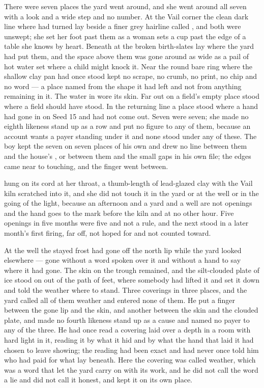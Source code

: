 There were seven places the yard went around, and she went around all seven with a look and a wide step and no number. At the Vail corner the clean dark line where  had turned lay beside a finer grey hairline called , and both were unswept; she set her foot past them as a woman sets a cup past the edge of a table she knows by heart. Beneath  at  the broken birth-slates lay where the yard had put them, and the space above them was gone around as wide as a pail of hot water set where a child might knock it. Near  the round bare ring where the shallow clay pan had once stood kept no scrape, no crumb, no print, no chip and no word --- a place named from the shape it had left and not from anything remaining in it. The water in  wore its skin. Far out on  a field's empty place stood where a field should have stood. In the returning line a place stood where a hand had gone in on Seed 15 and had not come out. Seven were seven; she made no eighth likeness stand up as a row and put no figure to any of them, because an account wants a payer standing under it and none stood under any of these. The boy kept the seven on seven places of his own and drew no line between them and the house's , or between them and the small gaps in his own file; the edges came near to touching, and the finger went between.

 hung on its cord at her throat, a thumb-length of lead-glazed clay with the Vail kiln scratched into it, and she did not touch it in the yard or at the well or in the going of the light, because an afternoon and a yard and a well are not openings and the hand goes to the mark before the kiln and at no other hour. Five openings in five months were five and not a rule, and the next stood in a later month's first firing, far off, not hoped for and not counted toward.

At the well the stayed frost had gone off the north lip while the yard looked elsewhere --- gone without a word spoken over it and without a hand to say where it had gone. The skin on the trough remained, and the silt-clouded plate of ice stood on  out of the path of feet, where somebody had lifted it and set it down and told the weather where to stand. Three coverings in three places, and the yard called all of them weather and entered none of them. He put a finger between the gone lip and the skin, and another between the skin and the clouded plate, and made no fourth likeness stand up as a cause and named no payer to any of the three. He had once read a covering laid over a depth in a room with hard light in it, reading it by what it hid and by what the hand that laid it had chosen to leave showing; the reading had been exact and had never once told him who had paid for what lay beneath. Here the covering was called weather, which was a word that let the yard carry on with its work, and he did not call the word a lie and did not call it honest, and kept it on its own place.

